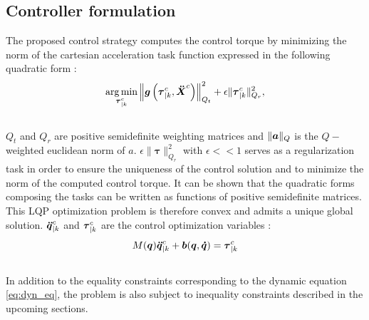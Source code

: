 \documentclass[a4paper, 10pt, conference]{ieeeconf}      %
\newcommand{\vect}[1]{\mbox{\boldmath${#1}$}}%
\DeclareMathOperator*{\argmin}{arg\,min}
\begin{document}
\subsection{Controller formulation}
The proposed control strategy computes the control torque by minimizing the norm of the  cartesian acceleration task function expressed in the following quadratic form : 
\begin{equation}
\argmin \limits_{\boldsymbol{\tau}_{|k}^{c}}  \left\| \vect{g}\left(\boldsymbol{\tau}_{|k}^{c},\vect{\ddot{X}}^c\right) \right\|_{Q_t}^2 + \epsilon  \| \boldsymbol{\tau}_{|k}^{c} \|_{Q_r}^2,
\label{eq:ctrl_pb}
\end{equation}
\\
$Q_t$ and $Q_r$ are  positive semidefinite weighting matrices and $\| \vect{a} \|_{Q}$ is the $Q-$weighted euclidean norm of $a$. $\epsilon  \| \boldsymbol{\tau} \|_{Q_r}^2$ with $\epsilon << 1$ serves as a regularization task in order to ensure the uniqueness of the control solution and to minimize the norm of the computed control torque. It can be shown that the quadratic forms composing the tasks can be written as functions of positive semidefinite matrices. This LQP optimization problem is therefore convex and admits a unique global solution. 
$\vect{\ddot{q}}_{|k}^{c}$ and $\vect{\tau}_{|k}^{c}$ are the control optimization variables : 
\begin{equation}
M(\vect{q}) \vect{\ddot{q}}_{|k}^{c} + \vect{b}(\vect{q},\vect{\dot{q}}) = \vect{\tau}_{|k}^{c}
\label{eq:dyn_eq}
\end{equation}
\\ 
In addition to the equality constraints corresponding to the dynamic equation \eqref{eq:dyn_eq}, the problem is also subject to inequality constraints described in the upcoming sections. 
\end{document}
